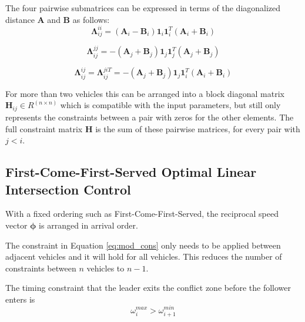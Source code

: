 The four pairwise submatrices can be expressed in terms of the diagonalized distance $\bm{A}$ and $\bm{B}$ as follows:
\begin{equation}
\bm{\Lambda}_{ij}^{ii} =  (\bm{A}_i - \bm{B}_i)\bm{1}_i\bm{1}_i^T(\bm{A}_i + \bm{B}_i)
\end{equation}

\begin{equation}
\bm{\Lambda}_{ij}^{jj} =  - (\bm{A}_j + \bm{B}_j)\bm{1}_j\bm{1}_j^T(\bm{A}_j + \bm{B}_j)
\end{equation}

\begin{equation}
\bm{\Lambda}_{ij}^{ij} = \bm{\Lambda}_{ij}^{ji T}  =  - (\bm{A}_j + \bm{B}_j)\bm{1}_j\bm{1}_i^T(\bm{A}_i + \bm{B}_i)
\end{equation}

For more than two vehicles this can be arranged into a
block diagonal matrix $\bm{H}_{ij} \in R^{(n \times n)}$ which is compatible with the input parameters, but still only represents the constraints between a pair with zeros for the other elements. The full constraint matrix $\bm{H}$ is the sum of these pairwise matrices, for every pair with $j<i$. 










\subsection{First-Come-First-Served Optimal Linear Intersection Control}
With a fixed ordering such as First-Come-First-Served, the reciprocal speed vector $\bm{\phi}$ is arranged in arrival order. 

The constraint in Equation \ref{eq:mod_cons} only needs to be applied between adjacent vehicles and it will hold for all vehicles. This reduces the number of constraints between $n$ vehicles to $n-1$.

The timing constraint that the leader exits the conflict zone before the follower enters is 
\begin{equation}
\omega_i^{max} > \omega_{i+1}^{min}
\end{equation}

